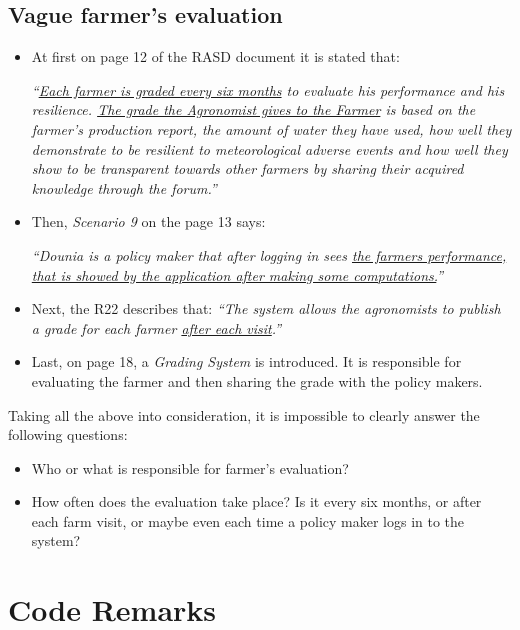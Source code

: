\subsection{Vague farmer's evaluation}

\begin{itemize}
\item At first on page 12 of the RASD document it is stated that:

\textit{``\ul{Each farmer is graded every six months} to evaluate his performance and his resilience. \ul{The grade the Agronomist gives to the Farmer} is based on the farmer’s production report, the amount of water they have used, how well they demonstrate to be resilient to meteorological adverse events and how well they show to be transparent towards other farmers by sharing their acquired knowledge through the forum.''}

\item Then, \textit{Scenario 9} on the page 13 says:

\textit{``Dounia is a policy maker that after logging in sees \ul{the farmers performance, that is showed by the application after making some computations.}''}

\item Next, the R22 describes that: \textit{``The system allows the agronomists to publish a grade for each farmer \ul{after each visit}.''}

\item Last, on page 18, a \textit{Grading System} is introduced. It is responsible for evaluating the farmer and then sharing the grade with the policy makers.
\end{itemize}

Taking all the above into consideration, it is impossible to clearly answer the following questions:
\begin{itemize}
    \item Who or what is responsible for farmer's evaluation?
    \item How often does the evaluation take place? Is it every six months, or after each farm visit, or maybe even each time a policy maker logs in to the system?
\end{itemize}

\section{Code Remarks}

